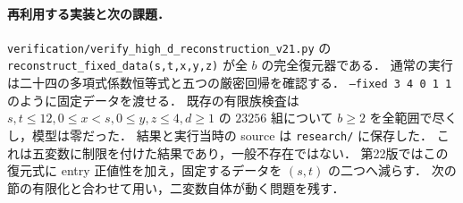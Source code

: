 \paragraph{再利用する実装と次の課題．}
\nolinkurl{verification/verify_high_d_reconstruction_v21.py} の
\texttt{reconstruct\_fixed\_data(s,t,x,y,z)} が全 $b$ の完全復元器である．
通常の実行は二十四の多項式係数恒等式と五つの厳密回帰を確認する．
\texttt{--fixed 3 4 0 1 1} のように固定データを渡せる．
既存の有限族検査は $s,t\le12,0\le x<s,0\le y,z\le4,d\ge1$ の
$23256$ 組について $b\ge2$ を全範囲で尽くし，模型は零だった．
結果と実行当時の source は \nolinkurl{research/} に保存した．
これは五変数に制限を付けた結果であり，一般不存在ではない．
第22版ではこの復元式に entry 正値性を加え，固定するデータを $(s,t)$ の二つへ減らす．
次の節の有限化と合わせて用い，二変数自体が動く問題を残す．
